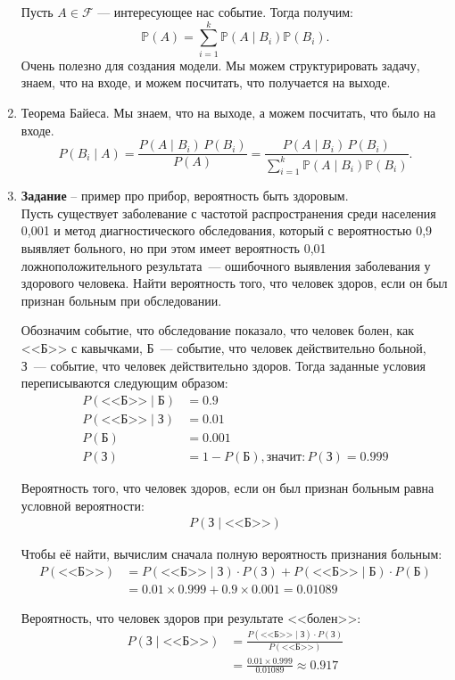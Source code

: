 \begin{enumerate}
Пусть $A \in \mathcal{F}$ --- интересующее нас событие. Тогда получим:
$$\mathbb{P}(A) = \sum\limits_{i=1}^{k} \mathbb{P}( A \mid B_i) \mathbb{P}(B_i).$$
Очень полезно для создания модели. Мы можем структурировать задачу, знаем, что на входе, и можем посчитать, что получается на выходе.
\item  Теорема Байеса. Мы знаем, что на выходе, а можем посчитать, что было на входе.
$$P(B_i \mid A) = \frac{P(A \mid B_i)\, P(B_i)}{P(A)} = \frac{P(A \mid B_i)\, P(B_i)}{\sum\limits_{i=1}^{k} \mathbb{P}( A \mid B_i) \mathbb{P}(B_i)}.$$
\item
\textbf{Задание} – пример про прибор, вероятность быть здоровым.\\
Пусть существует заболевание с частотой распространения среди населения 0,001 и метод диагностического обследования, который с вероятностью 0,9 выявляет больного, но при этом имеет вероятность 0,01 ложноположительного результата — ошибочного выявления заболевания у здорового человека. Найти вероятность того, что человек здоров, если он был признан больным при обследовании.

Обозначим событие, что обследование показало, что человек болен, как <<Б>> с кавычками, Б --- событие, что человек действительно больной, З --- событие, что человек действительно здоров. Тогда заданные условия переписываются следующим образом:
\begin{align*}P(\text{<<Б>>} \mid \text{Б}) &=0.9 \\
P(\text{<<Б>>} \mid \text{З}) &= 0.01 \\
P(\text{Б}) &= 0.001 \\
P(\text{З}) &= 1-P(\text{Б}), \text{значит}:
P(\text{З}) = 0.999 
\end{align*}

Вероятность того, что человек здоров, если он был признан больным равна условной вероятности:
\begin{align*}
P(\text{З} \mid \text{<<Б>>})
\end{align*}

Чтобы её найти, вычислим сначала полную вероятность признания больным:
\begin{align*}
P(\text{<<Б>>})&= P(\text{<<Б>>} \mid \text{З})\cdot P(\text{З})+P(\text{<<Б>>} \mid \text{Б})\cdot P(\text{Б}) \\ &= 0.01 \times 0.999 + 0.9 \times 0.001=0.01089
\end{align*}

Вероятность, что человек здоров при результате <<болен>>:
\begin{align*}
P(\text{З} \mid \text{<<Б>>}) &=
\frac
{P(\text{<<Б>>} \mid \text{З}) \cdot P(\text{З})}
{P(\text{<<Б>>})} \\ &=
\frac
{0.01 \times 0.999}
{0.01089}
\approx 0.917
\end{align*}


\end{enumerate}
